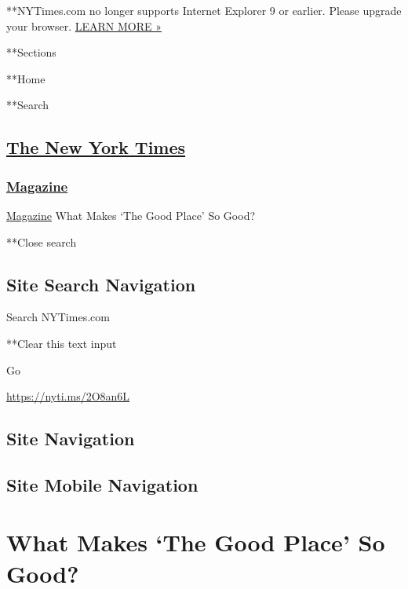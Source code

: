  **NYTimes.com no longer supports Internet Explorer 9 or earlier. Please
upgrade your browser.
\href{http://www.nytimes3xbfgragh.onion/content/help/site/ie9-support.html}{LEARN
MORE »}

**Sections

**Home

**Search

\hypertarget{the-new-york-times}{%
\subsection{\texorpdfstring{\href{http://www.nytimes3xbfgragh.onion/}{The
New York Times}}{The New York Times}}\label{the-new-york-times}}

\hypertarget{-magazine-}{%
\subsubsection{\texorpdfstring{
\href{https://www.nytimes3xbfgragh.onion/section/magazine}{Magazine}
}{ Magazine }}\label{-magazine-}}

 \href{https://www.nytimes3xbfgragh.onion/section/magazine}{Magazine}
\textbar{}What Makes `The Good Place' So Good?

**Close search

\hypertarget{site-search-navigation}{%
\subsection{Site Search Navigation}\label{site-search-navigation}}

Search NYTimes.com

**Clear this text input

Go

\url{https://nyti.ms/2O8an6L}

\hypertarget{site-navigation}{%
\subsection{Site Navigation}\label{site-navigation}}

\hypertarget{site-mobile-navigation}{%
\subsection{Site Mobile Navigation}\label{site-mobile-navigation}}

\hypertarget{what-makes-the-good-place-so-good}{%
\section{What Makes `The Good Place' So
Good?}\label{what-makes-the-good-place-so-good}}

